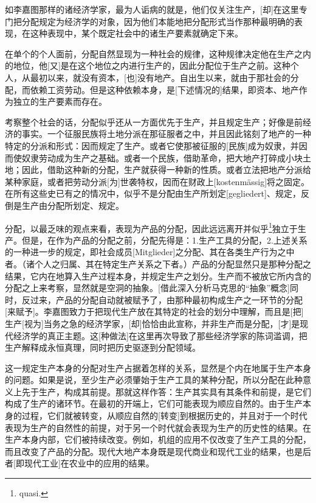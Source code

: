\documentclass[a4paper,twoside,12pt]{ctexart}
\begin{document}
如李嘉图那样的诸经济学家，最为人诟病的就是，他们仅关注生产，[却]在这里专门把分配规定为经济学的对象，因为他们本能地把分配形式当作那种最明确的表现，在这种表现中，某个既定社会中的诸生产要素就确定下来。

在单个的个人面前，分配自然显现为一种社会的规律，这种规律决定他在生产之内的地位，他[又]是在这个地位之内进行生产的，因此分配位于生产之前。这种个人，从最初以来，就没有资本，[也]没有地产。自出生以来，就由于那社会的分配，而依赖工资劳动。但是这种依赖本身，是[下述情况的]结果，即资本、地产作为独立的生产要素而存在。

考察整个社会的话，分配似乎还从一方面优先于生产，并且规定生产；好像是前经济的事实。一个征服民族将土地分派在那征服者之中，并且因此铭刻了地产的一种特定的分派和形式：因而规定了生产。或者它使那被征服的[民族]成为奴隶，并因而使奴隶劳动成为生产之基础。或者一个民族，借助革命，把大地产打碎成小块土地；因此，借助这种新的分配，生产就获得一种新的性质。或者立法把地产分派给某种家庭，或者把劳动分派[为]世袭特权，因而在财政上[kostenmässig]将之固定。在所有这些史已有之的情况中，似乎不是分配由生产所划定[gegliedert]、规定，反倒是生产由分配所划定、规定。


分配，以最乏味的观点来看，表现为产品的分配，因此远远离开并似乎\footnote{quasi. }独立于生产。但是，在作为产品的分配之前，分配先得是：1.生产工具的分配，2.上述关系的一种进一步的规定，即社会成员[Mitglieder]之分配、其在各类生产行为之中者。（诸个人之归属、其在特定生产关系之下者。）产品的分配显然只是那种分配之结果，它内在地算入生产过程本身，并规定生产之划分。生产而不被放它所内含的分配之上来考察，显然就是空洞的抽象。[借此深入分析马克思的“抽象”概念]同时，反过来，产品的分配自动就被赋予了，由那种最初构成生产之一环节的分配[来赋予]。李嘉图致力于把现代生产放在其特定的社会的划分中理解，而且是[把]生产[视为]当务之急的经济学家，[却]恰恰由此宣称，并非生产而是分配，[才]是现代经济学的真正主题。这[种做法]在这里再次导致了那些经济学家的陈词滥调，把生产解释成永恒真理，同时把历史驱逐到分配领域。


这一规定生产本身的分配对生产占据着怎样的关系，显然是个内在地属于生产本身的问题。如果是说，至少生产必须肇始于生产工具的某种分配，所以分配在此种意义上先于生产，构成其前提。那就这样作答：生产其实具有其条件和前提，是它们构成了生产的诸环节。在最初的开端上，它们可能表现为顺应自然的。由于生产本身的过程，它们就被转变，从顺应自然的[转变]到根据历史的，并且对于一个时代表现为生产的自然性的前提，对于另一个时代就会表现为生产的历史性的结果。在生产本身内部，它们被持续改变。例如，机组的应用不仅改变了生产工具的分配，而且改变了产品的分配。现代大地产本身既是现代商业和现代工业的结果，也是后者[即现代工业]在农业中的应用的结果。
\end{document}
